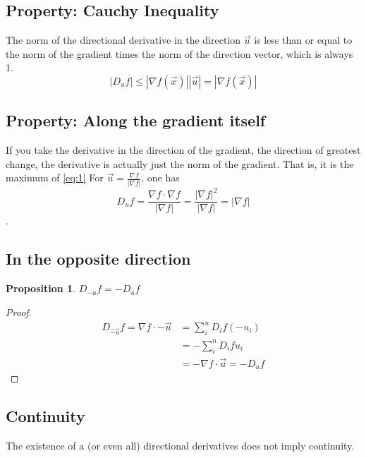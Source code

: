 \documentclass[12pt]{article}
\newtheorem{proposition}{Proposition}[theorem]
\theoremstyle{definition}
\theoremstyle{remark}
\begin{document}
\subsection{Property: Cauchy Inequality}\label{cauchy}The norm of the directional derivative in the direction $\vec{u}$ is less than or equal to the norm of the gradient times the norm of the direction vector, which is always 1.
\begin{equation} \label{eq:1}
    |D_u f|\leq |\nabla f(\vec{x})||\vec{u}|=|\nabla f(\vec{x})|
\end{equation}
\subsection{Property: Along the gradient itself}
If you take the derivative in the direction of the gradient, the direction of greatest change, the derivative is actually just the norm of the gradient. That is, it is the maximum of \ref{eq:1}
For $\vec{u}=\frac{\nabla f}{|\nabla f|}$, one has
$$D_u f=\frac{\nabla f\cdot \nabla f}{|\nabla f|}=\frac{|\nabla f|^2}{|\nabla f|}=|\nabla f|$$.
\subsection{In the opposite direction}
\begin{proposition}{$D_{-u}f=-D_u f$}\end{proposition}
\begin{proof}
\begin{align*}
    D_{\vec{-u}}f=\nabla f\cdot -\vec{u}&=\sum_i^n D_i f(-u_i)\\
    &=-\sum_i^nD_ifu_i\\
    &=-\nabla f\cdot \vec{u}=-D_uf
\end{align*}
\end{proof}

\subsection{Continuity}
The existence of a (or even all) directional derivatives does not imply continuity.
\end{document}
